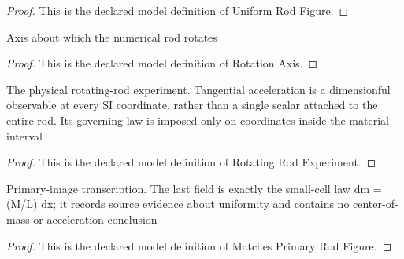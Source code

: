 \begin{proof}
  This is the declared model definition of Uniform Rod Figure.
\end{proof}
\begin{definition}
  \label{def:physics:phyx-mini-0697:phyxminiproblems-problemphyxmini0697-rotationaxis}
  Axis about which the numerical rod rotates
\end{definition}
\begin{proof}
  This is the declared model definition of Rotation Axis.
\end{proof}
\begin{definition}
  \label{def:physics:phyx-mini-0697:phyxminiproblems-problemphyxmini0697-rotatingrodexperiment}
  The physical rotating-rod experiment. Tangential acceleration is a dimensionful observable at every SI coordinate, rather than a single scalar attached to the entire rod. Its governing law is imposed only on coordinates inside the material interval
\end{definition}
\begin{proof}
  This is the declared model definition of Rotating Rod Experiment.
\end{proof}
\begin{definition}
  \label{def:physics:phyx-mini-0697:phyxminiproblems-problemphyxmini0697-matchesprimaryrodfigure}
  Primary-image transcription. The last field is exactly the small-cell law dm = (M/L) dx; it records source evidence about uniformity and contains no center-of-mass or acceleration conclusion
\end{definition}
\begin{proof}
  This is the declared model definition of Matches Primary Rod Figure.
\end{proof}
